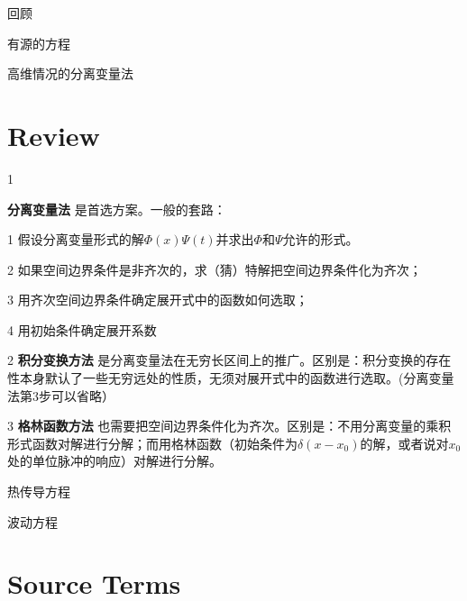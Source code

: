 \documentclass[CJK]{beamer}
\date{}
\begin{document}

\begin{frame}
\bch
\bitem
\item{回顾}
\item{有源的方程}    
\item{高维情况的分离变量法}
\eitem
\ech
\end{frame}


\section{Review}

\begin{frame}
\bch
\bitem
\item[1]{{\blue \bf 分离变量法} 是首选方案。一般的套路：
  \bitem
      \item[1]{ 假设分离变量形式的解$\Phi(x)\Psi(t)$并求出$\Phi$和$\Psi$允许的形式。}
      \item[2]{如果空间边界条件是非齐次的，求（猜）特解把空间边界条件化为齐次； }
      \item[3]{用齐次空间边界条件确定展开式中的函数如何选取；}
      \item[4]{用初始条件确定展开系数}
        \eitem}
\item[2]{{\blue \bf 积分变换方法} 是分离变量法在无穷长区间上的推广。区别是：积分变换的存在性本身默认了一些无穷远处的性质，无须对展开式中的函数进行选取。(分离变量法第3步可以省略）}
\item[3]{{\blue \bf 格林函数方法} 也需要把空间边界条件化为齐次。区别是：不用分离变量的乘积形式函数对解进行分解；而用格林函数（初始条件为$\delta(x-x_0)$的解，或者说对$x_0$处的单位脉冲的响应）对解进行分解。}
\eitem
\ech
\end{frame}


\begin{frame}
\bch
热传导方程

波动方程

\ech
\end{frame}

\section{Source Terms}
\end{document}
